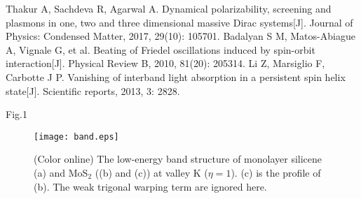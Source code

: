 \documentclass[UTF8,a4paper]{article}
\begin{document}
\begin{thebibliography}{99}
Thakur A, Sachdeva R, Agarwal A. Dynamical polarizability, screening and plasmons in one, two and three dimensional massive Dirac systems[J]. Journal of Physics: Condensed Matter, 2017, 29(10): 105701.
Badalyan S M, Matos-Abiague A, Vignale G, et al. Beating of Friedel oscillations induced by spin-orbit interaction[J]. Physical Review B, 2010, 81(20): 205314.
Li Z, Marsiglio F, Carbotte J P. Vanishing of interband light absorption in a persistent spin helix state[J]. Scientific reports, 2013, 3: 2828.




\end{thebibliography}
\clearpage
Fig.1
\begin{figure}[!ht]
   \centering
 \centering
   \begin{center}
     \texttt{[image: band.eps]}
\caption{(Color online) The low-energy band structure of monolayer silicene (a) and MoS$_{2}$ ((b) and (c)) at valley K ($\eta=1$).
(c) is the profile of (b).
The weak trigonal warping term are ignored here.
}
   \end{center}
\end{figure}
\end{document}
